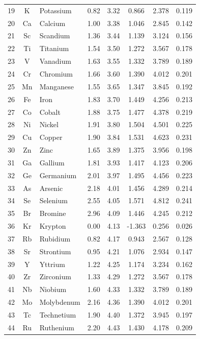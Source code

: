 \documentclass[12pt,a4paper]{article}
\theoremstyle{remark}
\begin{document}
\begin{longtable}{|c|c|p{2.5cm}|c|c|c|c|c|}
		19 & K & Potassium & 0.82 & 3.32 & 0.866 & 2.378 & 0.119 \\
		20 & Ca & Calcium & 1.00 & 3.38 & 1.046 & 2.845 & 0.142 \\
		21 & Sc & Scandium & 1.36 & 3.44 & 1.139 & 3.124 & 0.156 \\
		22 & Ti & Titanium & 1.54 & 3.50 & 1.272 & 3.567 & 0.178 \\
		23 & V & Vanadium & 1.63 & 3.55 & 1.332 & 3.789 & 0.189 \\
		24 & Cr & Chromium & 1.66 & 3.60 & 1.390 & 4.012 & 0.201 \\
		25 & Mn & Manganese & 1.55 & 3.65 & 1.347 & 3.845 & 0.192 \\
		26 & Fe & Iron & 1.83 & 3.70 & 1.449 & 4.256 & 0.213 \\
		27 & Co & Cobalt & 1.88 & 3.75 & 1.477 & 4.378 & 0.219 \\
		28 & Ni & Nickel & 1.91 & 3.80 & 1.504 & 4.501 & 0.225 \\
		29 & Cu & Copper & 1.90 & 3.84 & 1.531 & 4.623 & 0.231 \\
		30 & Zn & Zinc & 1.65 & 3.89 & 1.375 & 3.956 & 0.198 \\
		31 & Ga & Gallium & 1.81 & 3.93 & 1.417 & 4.123 & 0.206 \\
		32 & Ge & Germanium & 2.01 & 3.97 & 1.495 & 4.456 & 0.223 \\
		33 & As & Arsenic & 2.18 & 4.01 & 1.456 & 4.289 & 0.214 \\
		34 & Se & Selenium & 2.55 & 4.05 & 1.571 & 4.812 & 0.241 \\
		35 & Br & Bromine & 2.96 & 4.09 & 1.446 & 4.245 & 0.212 \\
		36 & Kr & Krypton & 0.00 & 4.13 & -1.363 & 0.256 & 0.026 \\
		37 & Rb & Rubidium & 0.82 & 4.17 & 0.943 & 2.567 & 0.128 \\
		38 & Sr & Strontium & 0.95 & 4.21 & 1.076 & 2.934 & 0.147 \\
		39 & Y & Yttrium & 1.22 & 4.25 & 1.174 & 3.234 & 0.162 \\
		40 & Zr & Zirconium & 1.33 & 4.29 & 1.272 & 3.567 & 0.178 \\
		41 & Nb & Niobium & 1.60 & 4.33 & 1.332 & 3.789 & 0.189 \\
		42 & Mo & Molybdenum & 2.16 & 4.36 & 1.390 & 4.012 & 0.201 \\
		43 & Tc & Technetium & 1.90 & 4.40 & 1.372 & 3.945 & 0.197 \\
		44 & Ru & Ruthenium & 2.20 & 4.43 & 1.430 & 4.178 & 0.209 \\

\end{longtable}
\end{document}

